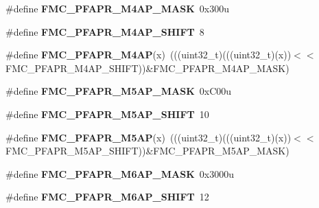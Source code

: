 \begin{DoxyCompactItemize}
\item 
\#define {\bfseries F\+M\+C\+\_\+\+P\+F\+A\+P\+R\+\_\+\+M4\+A\+P\+\_\+\+M\+A\+SK}~0x300u\hypertarget{group__FMC__Register__Masks_ga7a4045976082b3e527eddd6a51204aaa}{}\label{group__FMC__Register__Masks_ga7a4045976082b3e527eddd6a51204aaa}

\item 
\#define {\bfseries F\+M\+C\+\_\+\+P\+F\+A\+P\+R\+\_\+\+M4\+A\+P\+\_\+\+S\+H\+I\+FT}~8\hypertarget{group__FMC__Register__Masks_gab5d59455fa080c08cf37d632a2b698cc}{}\label{group__FMC__Register__Masks_gab5d59455fa080c08cf37d632a2b698cc}

\item 
\#define {\bfseries F\+M\+C\+\_\+\+P\+F\+A\+P\+R\+\_\+\+M4\+AP}(x)~(((uint32\+\_\+t)(((uint32\+\_\+t)(x))$<$$<$F\+M\+C\+\_\+\+P\+F\+A\+P\+R\+\_\+\+M4\+A\+P\+\_\+\+S\+H\+I\+FT))\&F\+M\+C\+\_\+\+P\+F\+A\+P\+R\+\_\+\+M4\+A\+P\+\_\+\+M\+A\+SK)\hypertarget{group__FMC__Register__Masks_ga20f0161a402dbe046613f474f38ab1e7}{}\label{group__FMC__Register__Masks_ga20f0161a402dbe046613f474f38ab1e7}

\item 
\#define {\bfseries F\+M\+C\+\_\+\+P\+F\+A\+P\+R\+\_\+\+M5\+A\+P\+\_\+\+M\+A\+SK}~0x\+C00u\hypertarget{group__FMC__Register__Masks_ga85d2b86b0ca3d8a66162fbf7b5394ad7}{}\label{group__FMC__Register__Masks_ga85d2b86b0ca3d8a66162fbf7b5394ad7}

\item 
\#define {\bfseries F\+M\+C\+\_\+\+P\+F\+A\+P\+R\+\_\+\+M5\+A\+P\+\_\+\+S\+H\+I\+FT}~10\hypertarget{group__FMC__Register__Masks_gaf26c0e236405436e3ceb23fa596ce8a5}{}\label{group__FMC__Register__Masks_gaf26c0e236405436e3ceb23fa596ce8a5}

\item 
\#define {\bfseries F\+M\+C\+\_\+\+P\+F\+A\+P\+R\+\_\+\+M5\+AP}(x)~(((uint32\+\_\+t)(((uint32\+\_\+t)(x))$<$$<$F\+M\+C\+\_\+\+P\+F\+A\+P\+R\+\_\+\+M5\+A\+P\+\_\+\+S\+H\+I\+FT))\&F\+M\+C\+\_\+\+P\+F\+A\+P\+R\+\_\+\+M5\+A\+P\+\_\+\+M\+A\+SK)\hypertarget{group__FMC__Register__Masks_ga999fd0b70fe768b1d7171fecf2914776}{}\label{group__FMC__Register__Masks_ga999fd0b70fe768b1d7171fecf2914776}

\item 
\#define {\bfseries F\+M\+C\+\_\+\+P\+F\+A\+P\+R\+\_\+\+M6\+A\+P\+\_\+\+M\+A\+SK}~0x3000u\hypertarget{group__FMC__Register__Masks_gaa369bff90649d5651eec5c6a306b3502}{}\label{group__FMC__Register__Masks_gaa369bff90649d5651eec5c6a306b3502}

\item 
\#define {\bfseries F\+M\+C\+\_\+\+P\+F\+A\+P\+R\+\_\+\+M6\+A\+P\+\_\+\+S\+H\+I\+FT}~12\hypertarget{group__FMC__Register__Masks_ga20c7a1c28737c267b2210e13f7483628}{}\label{group__FMC__Register__Masks_ga20c7a1c28737c267b2210e13f7483628}


\end{DoxyCompactItemize}
